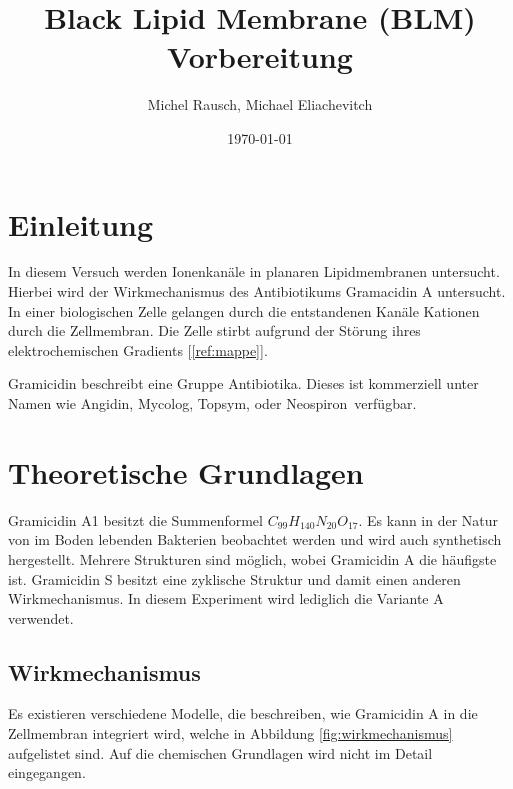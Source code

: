 \documentclass[a4paper,ngerman]{scrartcl}
\title{Black Lipid Membrane (BLM)\\Vorbereitung}
\date{\today}
\author{Michel Rausch, Michael Eliachevitch}
\begin{document}
\maketitle
\tableofcontents
\newpage

\section{Einleitung}

In diesem Versuch werden Ionenkanäle in planaren Lipidmembranen untersucht. Hierbei wird der Wirkmechanismus des Antibiotikums Gramacidin A untersucht. In einer biologischen Zelle gelangen durch die entstandenen Kanäle Kationen durch die Zellmembran. Die Zelle stirbt aufgrund der Störung ihres elektrochemischen Gradients [\ref{ref:mappe}].

Gramicidin beschreibt eine Gruppe Antibiotika. Dieses ist kommerziell unter Namen wie Angidin\textregistered , Mycolog\textregistered , Topsym\textregistered , oder Neospiron\textregistered \ verfügbar. 


\section{Theoretische Grundlagen}

Gramicidin A1 besitzt die Summenformel $C_{99}H_{140}N_{20}O_{17}$. Es kann in der Natur von im Boden lebenden Bakterien beobachtet werden und wird auch synthetisch hergestellt. Mehrere Strukturen sind möglich, wobei Gramicidin A die häufigste ist. Gramicidin S besitzt eine zyklische Struktur und damit einen anderen Wirkmechanismus. In diesem Experiment wird lediglich die Variante A verwendet.

\subsection{Wirkmechanismus}

Es existieren verschiedene Modelle, die beschreiben, wie Gramicidin A in die Zellmembran integriert wird, welche in Abbildung \ref{fig:wirkmechanismus} aufgelistet sind. Auf die chemischen Grundlagen wird nicht im Detail eingegangen.
\end{document}
